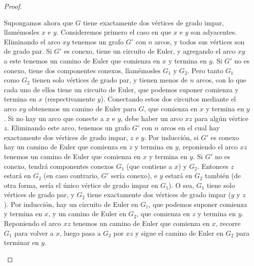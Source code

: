 \begin{proof}
\begin{description}
      Supongamos ahora que \(G\)
      tiene exactamente dos vértices de grado impar,
      llamémosles \(x\) e \(y\).
      Consideremos primero el caso
      en que \(x\) e \(y\) son adyacentes.
      Eliminando el arco \(x y\)
      tenemos un grafo \(G'\) con \(n\) arcos,
      y todos sus vértices son de grado par.
      Si \(G'\) es conexo,
      tiene un circuito de Euler,
      y agregando el arco \(x y\) a este tenemos un camino de Euler
      que comienza en \(x\) y termina en \(y\).
      Si \(G'\) no es conexo,
      tiene dos componentes conexos,
      llamémosles \(G_1\) y \(G_2\).
      Pero tanto \(G_1\) como \(G_2\)
      tienen solo vértices de grado par,
      y tienen menos de \(n\) arcos,
      con lo que cada uno de ellos tiene un circuito de Euler,
      que podemos suponer comienza y termina en \(x\)
      (respectivamente \(y\)).
      Conectando estos dos circuitos mediante el arco \(x y\)
      obtenemos un camino de Euler para \(G\),
      que comienza en \(x\) y termina en \(y\).
      Si no hay un arco que conecte a \(x\) e \(y\),
      debe haber un arco \(x z\) para algún vértice \(z\).
      Eliminando este arco,
      tenemos un grafo \(G'\) con \(n\) arcos
      en el cual hay exactamente dos vértices de grado impar,
      \(z\) e \(y\).
      Por inducción,
      si \(G'\) es conexo
      hay un camino de Euler
      que comienza en \(z\) y termina en \(y\),
      reponiendo el arco \(x z\)
      tenemos un camino de Euler
      que comienza en \(x\) y termina en \(y\).
      Si \(G'\) no es conexo,
      tendrá componentes conexos \(G_1\)
      (que contiene a \(x\))
      y \(G_2\).
      Entonces \(z\) estará en \(G_2\)
      (en caso contrario, \(G'\) sería conexo),
      e \(y\) estará en \(G_2\) también
      (de otra forma,
       sería el único vértice de grado impar en \(G_1\)).
      O sea,
      \(G_1\) tiene solo vértices de grado par,
      y \(G_2\) tiene exactamente dos vértices de grado impar
      (\(y\) y \(z\)).
      Por inducción,
      hay un circuito de Euler en \(G_1\),
      que podemos suponer comienza y termina en \(x\),
      y un camino de Euler en \(G_2\),
      que comienza en \(z\) y termina en \(y\).
      Reponiendo el arco \(x z\)
      tenemos un camino de Euler que comienza en \(x\),
      recorre \(G_1\) para volver a \(x\),
      luego pasa a \(G_2\) por \(x z\)
      y sigue el camino de Euler en \(G_2\) para terminar en \(y\).
    \qedhere
    \end{description}
  \end{proof}


